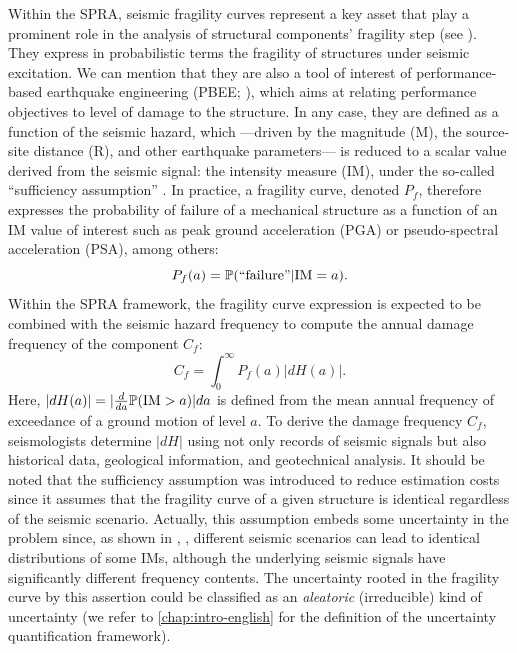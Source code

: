 Within the SPRA, seismic fragility curves represent a key asset that play a prominent role in the analysis of structural components' fragility step (see  \cite{epri_advanced_2011}).
They express in probabilistic terms the fragility of structures under seismic excitation. We can mention that they are also a tool of interest of performance-based earthquake engineering (PBEE; \cite{ghobarah_performance-based_2001,noh_development_2014}), 
which aims at relating performance objectives to level of damage to the structure.
In any case, they are defined as a function of the seismic hazard, which ---driven by the magnitude (M), the source-site distance (R), and other earthquake parameters--- is reduced to a scalar value derived from the seismic signal: the intensity measure (IM), under the so-called ``sufficiency assumption'' \citep{cornell_hazard_2004,luco_structure-specific_2007}.
In practice, a fragility curve, denoted $P_f$, therefore expresses the probability of failure of a mechanical structure as a function of an IM value of interest such as peak ground acceleration (PGA) or pseudo-spectral acceleration (PSA), among others:
    \begin{equation}
        P_f(a) = \mathbb{P}(\text{``failure''}|\text{IM}=a).
    \end{equation}
Within the SPRA framework, the fragility curve expression is expected to be combined with the seismic hazard frequency to compute the  annual damage frequency of the component $C_f$:
    \begin{equation}\label{eq:intro-frags:damagefrequency}
        C_f =  \int_0^\infty P_f(a)\left|dH(a)\right|.
    \end{equation}
Here, $|dH(a)|=|\frac{d}{da}\mathbb{P}(\text{IM}>a)|da$ is defined from the mean annual  frequency of exceedance of a ground motion of level $a$. %
To derive the damage frequency $C_f$, seismologists determine $|dH|$ using not only records of seismic signals but also historical data, geological information, and geotechnical analysis.
It should be noted that the sufficiency assumption was introduced to reduce estimation costs since it assumes that the fragility curve of a given structure is identical regardless of the seismic scenario.
Actually, this assumption embeds some uncertainty in the problem since, as shown in \citeauthor{radu_earthquake-source-based_2018}, , %
different seismic scenarios can lead to identical distributions of some IMs, although the underlying seismic signals have significantly different frequency contents.
The uncertainty rooted in the fragility curve by this assertion could be classified as an \emph{aleatoric} (irreducible) kind of uncertainty
 (we refer to \cref{chap:intro-english} for the definition of the uncertainty quantification framework).


